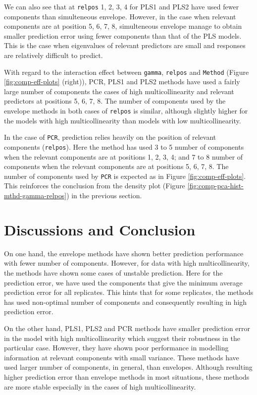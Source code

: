 \documentclass[12pt,3p,authoryear]{elsarticle}
\begin{document}
We can also see that at \texttt{relpos} 1, 2, 3, 4 for PLS1 and PLS2
have used fewer components than simulteneous envelope. However, in the
case when relevant components are at position 5, 6, 7, 8, simulteneous
envelope manage to obtain smaller prediction error using fewer
components than that of the PLS models. This is the case when
eigenvalues of relevant predictors are small and responses are
relatively difficult to predict.

With regard to the interaction effect between \texttt{gamma},
\texttt{relpos} and \texttt{Method} (Figure \ref{fig:comp-eff-plots}
(right)), PCR, PLS1 and PLS2 methods have used a fairly large number of
components the cases of high multicollinearity and relevant predictors
at positions 5, 6, 7, 8. The number of components used by the envelope
methods in both cases of \texttt{relpos} is similar, although slightly
higher for the models with high multicollinearity than models with low
multicollinearity.

In the case of \texttt{PCR}, prediction relies heavily on the position
of relevant components (\texttt{relpos}). Here the method has used 3 to
5 number of components when the relevant components are at positions 1,
2, 3, 4; and 7 to 8 number of components when the relevant components
are at positions 5, 6, 7, 8. The number of components used by
\texttt{PCR} is expected as in Figure \ref{fig:comp-eff-plots}. This
reinforces the conclusion from the density plot (Figure
\ref{fig:comp-pca-hist-mthd-gamma-relpos}) in the previous section.

\section{Discussions and Conclusion}\label{discussions-and-conclusion}

On one hand, the envelope methods have shown better prediction
performance with fewer number of components. However, for data with high
multicollinearity, the methods have shown some cases of unstable
prediction. Here for the prediction error, we have used the components
that give the minimum average prediction error for all replicates. This
hints that for some replicates, the methods has used non-optimal number
of components and consequently resulting in high prediction error.

On the other hand, PLS1, PLS2 and PCR methods have smaller prediction
error in the model with high multicollinearity which suggest their
robustness in the particular case. However, they have shown poor
performance in modelling information at relevant components with small
variance. These methods have used larger number of components, in
general, than envelopes. Although resulting higher prediction error than
envelope methods in most situations, these methods are more stable
especially in the cases of high multicollinearity.
\end{document}
